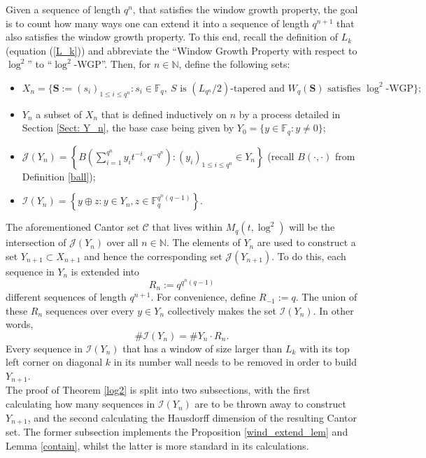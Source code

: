 \documentclass{article}
\theoremstyle{definition}
\newcommand{\N}{\mathbb{N}}
\newcommand{\F}{\mathbb{F}}
\numberwithin{equation}{subsection}
\begin{document}
 \noindent Given a sequence of length $q^n$, that satisfies the window growth property, the goal is to count how many ways one can extend it into a sequence of length $q^{n+1}$ that also satisfies the window growth property. To this end, recall the definition of $L_k$ (equation (\ref{L_k})) and abbreviate the ``Window Growth Property with respect to $\log^2$'' to ``$\log^2$-WGP''. Then, for $n\in\N$, define the following sets: \begin{itemize}
     \item $X_n=\{\mathbf{S}:=(s_i)_{1\le i \le q^n}: s_i\in\F_q,~S\text{ is }(L_{q^n}/2)\text{-tapered and }W_q(\mathbf{S})\text{ satisfies }\log^2\text{-WGP}\}; $
     \item $Y_n$ a subset of $X_n$ that is defined inductively on $n$ by a process detailed in Section \ref{Sect: Y_n}, the base case being given by $Y_0 = \{y\in\F_q: y\neq0\};$
     \item $\mathcal{J}(Y_n)=\left\{B\left(\sum_{i=1}^{q^n}y_it^{-i},q^{-q^n}\right): (y_i)_{1\le i \le q^n}\in Y_n\right\}$ (recall $B(\cdot,\cdot)$ from Definition \ref{ball});
     \item $\mathcal{I}(Y_{n})=\left\{y\oplus z: y\in Y_n, z\in\F_q^{q^{n}(q-1)}\right\}.$
 \end{itemize} The aforementioned Cantor set $\mathcal{C}$ that lives within $M_q(t,\log^2)$ will be the intersection of $\mathcal{J}(Y_n)$ over all $n\in\N$. The elements of $Y_n$ are used to construct a set $Y_{n+1}\subset X_{n+1}$ and hence the corresponding set $\mathcal{J}(Y_{n+1})$. To do this, each sequence in $Y_n$ is extended into \begin{equation}R_n:=q^{q^n(q-1)}\label{R_n}\end{equation} different sequences of length $q^{n+1}$. For convenience, define $R_{-1}:=q$. The union of these $R_n$ sequences over every $y\in Y_n$ collectively makes the set $\mathcal{I}(Y_{n})$. In other words, \begin{equation*}
      \#\mathcal{I}(Y_{n})=\#Y_n\cdot R_n.
 \end{equation*} Every sequence in $\mathcal{I}(Y_{n})$ that has a window of size larger than $L_k$ with its top left corner on diagonal $k$ in its number wall needs to be removed in order to build $Y_{n+1}$.\\

 \noindent The proof of Theorem \ref{log2} is split into two subsections, with the first calculating how many sequences in $\mathcal{I}(Y_{n})$ are to be thrown away to construct $Y_{n+1}$, and the second calculating the Hausdorff dimension of the resulting Cantor set. The former subsection implements the Proposition \ref{wind_extend_lem} and Lemma \ref{contain}, whilst the latter is more standard in its calculations.
\end{document}
